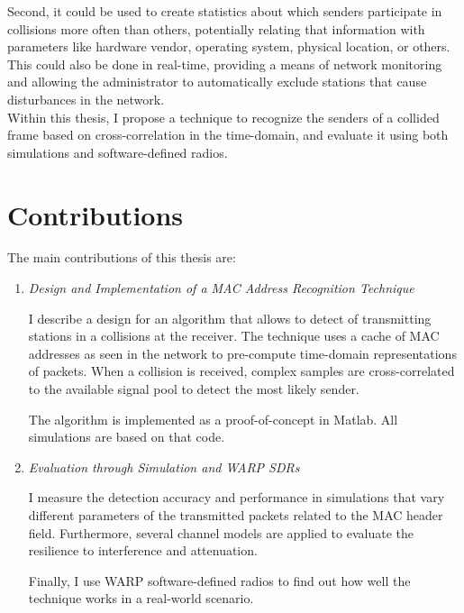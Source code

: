 Second, it could be used to create statistics about which senders participate in collisions more often than others, potentially relating that information with parameters like hardware vendor, operating system, physical location, or others. This could also be done in real-time, providing a means of network monitoring and allowing the administrator to automatically exclude stations that cause disturbances in the network.\\

Within this thesis, I propose a technique to recognize the senders of a collided frame based on cross-correlation in the time-domain, and evaluate it using both simulations and software-defined radios.

\clearpage



\section{Contributions}

The main contributions of this thesis are:

\begin{enumerate}
	\item \textit{Design and Implementation of a MAC Address Recognition Technique}

				I describe a design for an algorithm that allows to detect of transmitting stations in a collisions at the receiver. The technique uses a cache of MAC addresses as seen in the network to pre-compute time-domain representations of packets. When a collision is received, complex samples are cross-correlated to the available signal pool to detect the most likely sender.

				The algorithm is implemented as a proof-of-concept in Matlab. All simulations are based on that code.

	\item \textit{Evaluation through Simulation and WARP SDRs}

				I measure the detection accuracy and performance in simulations that vary different parameters of the transmitted packets related to the MAC header field. Furthermore, several channel models are applied to evaluate the resilience to interference and attenuation.

				Finally, I use WARP software-defined radios to find out how well the technique works in a real-world scenario.

\end{enumerate}


